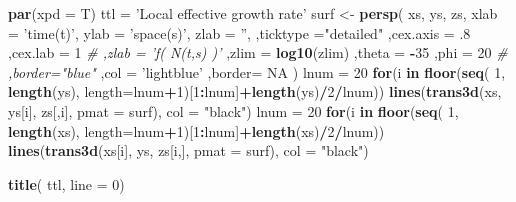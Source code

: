\documentclass[a4paperpaper,]{article}
\newenvironment{Shaded}{\begin{snugshade}}{\end{snugshade}}
\newcommand{\KeywordTok}[1]{\textcolor[rgb]{0.13,0.29,0.53}{\textbf{#1}}}
\newcommand{\DataTypeTok}[1]{\textcolor[rgb]{0.13,0.29,0.53}{#1}}
\newcommand{\DecValTok}[1]{\textcolor[rgb]{0.00,0.00,0.81}{#1}}
\newcommand{\StringTok}[1]{\textcolor[rgb]{0.31,0.60,0.02}{#1}}
\newcommand{\CommentTok}[1]{\textcolor[rgb]{0.56,0.35,0.01}{\textit{#1}}}
\newcommand{\OtherTok}[1]{\textcolor[rgb]{0.56,0.35,0.01}{#1}}
\newcommand{\ControlFlowTok}[1]{\textcolor[rgb]{0.13,0.29,0.53}{\textbf{#1}}}
\newcommand{\OperatorTok}[1]{\textcolor[rgb]{0.81,0.36,0.00}{\textbf{#1}}}
\newcommand{\NormalTok}[1]{#1}
\begin{document}
\begin{Shaded}
\begin{Highlighting}[]
{{{  \KeywordTok{par}\NormalTok{(}\DataTypeTok{xpd =}\NormalTok{ T)}
\NormalTok{  ttl =}\StringTok{ 'Local effective growth rate'}
\NormalTok{  surf <-}\StringTok{ }\KeywordTok{persp}\NormalTok{(}
\NormalTok{    xs,}
\NormalTok{    ys,}
\NormalTok{    zs,}
    \DataTypeTok{xlab =} \StringTok{'time(t)'}\NormalTok{,}
    \DataTypeTok{ylab =} \StringTok{'space(s)'}\NormalTok{,}
    \DataTypeTok{zlab =} \StringTok{''}\NormalTok{,}
\NormalTok{    ,}\DataTypeTok{ticktype =}\StringTok{"detailed"}
\NormalTok{    ,}\DataTypeTok{cex.axis =}\NormalTok{ .}\DecValTok{8}
\NormalTok{    ,}\DataTypeTok{cex.lab =} \DecValTok{1}
    \CommentTok{# ,zlab = 'f( N(t,s) )'}
\NormalTok{    ,}\DataTypeTok{zlim =} \KeywordTok{log10}\NormalTok{(zlim)}
\NormalTok{    ,}\DataTypeTok{theta =} \OperatorTok{-}\DecValTok{35}
\NormalTok{    ,}\DataTypeTok{phi =} \DecValTok{20}
    \CommentTok{# ,border="blue"}
\NormalTok{    ,}\DataTypeTok{col =} \StringTok{'lightblue'}
\NormalTok{    ,}\DataTypeTok{border=} \OtherTok{NA}
\NormalTok{  )}
\NormalTok{  lnum =}\StringTok{ }\DecValTok{20}
  \ControlFlowTok{for}\NormalTok{(i }\ControlFlowTok{in} \KeywordTok{floor}\NormalTok{(}\KeywordTok{seq}\NormalTok{( }\DecValTok{1}\NormalTok{, }\KeywordTok{length}\NormalTok{(ys), }\DataTypeTok{length=}\NormalTok{lnum}\OperatorTok{+}\DecValTok{1}\NormalTok{)[}\DecValTok{1}\OperatorTok{:}\NormalTok{lnum]}\OperatorTok{+}\KeywordTok{length}\NormalTok{(ys)}\OperatorTok{/}\DecValTok{2}\OperatorTok{/}\NormalTok{lnum)) }\KeywordTok{lines}\NormalTok{(}\KeywordTok{trans3d}\NormalTok{(xs, ys[i], zs[,i], }\DataTypeTok{pmat =}\NormalTok{ surf), }\DataTypeTok{col =} \StringTok{"black"}\NormalTok{)}
\NormalTok{  lnum =}\StringTok{ }\DecValTok{20}
  \ControlFlowTok{for}\NormalTok{(i }\ControlFlowTok{in} \KeywordTok{floor}\NormalTok{(}\KeywordTok{seq}\NormalTok{( }\DecValTok{1}\NormalTok{, }\KeywordTok{length}\NormalTok{(xs), }\DataTypeTok{length=}\NormalTok{lnum}\OperatorTok{+}\DecValTok{1}\NormalTok{)[}\DecValTok{1}\OperatorTok{:}\NormalTok{lnum]}\OperatorTok{+}\KeywordTok{length}\NormalTok{(xs)}\OperatorTok{/}\DecValTok{2}\OperatorTok{/}\NormalTok{lnum)) }\KeywordTok{lines}\NormalTok{(}\KeywordTok{trans3d}\NormalTok{(xs[i], ys, zs[i,], }\DataTypeTok{pmat =}\NormalTok{ surf), }\DataTypeTok{col =} \StringTok{"black"}\NormalTok{)}
  
  \KeywordTok{title}\NormalTok{( ttl, }\DataTypeTok{line =} \DecValTok{0}\NormalTok{)}
  
}}}
\end{Highlighting}
\end{Shaded}
\end{document}
